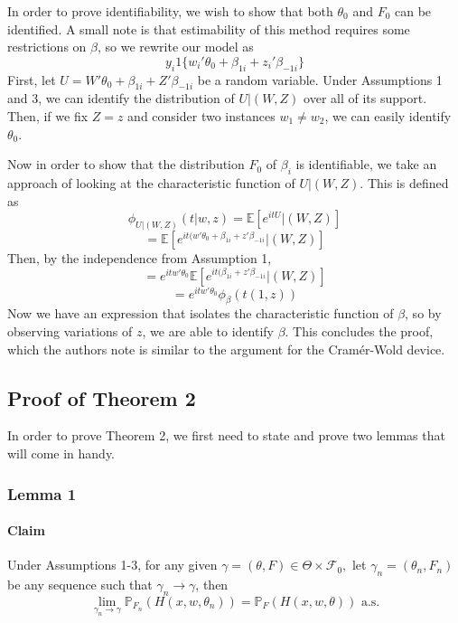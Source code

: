 \documentclass[11pt]{article}
\begin{document}
\indent

In order to prove identifiability, we wish to show that both $\theta_0$ and $F_0$ can be identified. A small note is that estimability of this method requires some restrictions on $\beta$, so we rewrite our model as
\[
y_i1\{w_i'\theta_0 + \beta_{1i} + z_i'\beta_{-1i}\}
\]
First, let $U=W'\theta_0 + \beta_{1i} + Z'\beta_{-1i}$ be a random variable. Under Assumptions 1 and 3, we can identify the distribution of $U|(W,Z)$  over all of its support. Then, if we fix $Z=z$ and consider two instances $w_1\neq w_2$, we can easily identify $\theta_0$.

Now in order to show that the distribution $F_0$ of $\beta_i$ is identifiable, we take an approach of looking at the characteristic function of $U|(W,Z)$. This is defined as
\[
\phi_{U|(W,Z)}(t|w,z)=\mathbb E[e^{itU}|(W,Z)]
\]
\[
=\mathbb E[e^{it(w'\theta_0+\beta_{1i}+z'\beta_{-1i}}|(W,Z)]
\]
Then, by the independence from Assumption 1,
\[
=e^{itw'\theta_0}\mathbb E[e^{it(\beta_{1i}+z'\beta_{-1i}}|(W,Z)]
\]
\[
=e^{itw'\theta_0}\phi_\beta(t(1,z))
\]
Now we have an expression that isolates the characteristic function of $\beta$, so by observing variations of $z$, we are able to identify $\beta$. This concludes the proof, which the authors note is similar to the argument for the Cramér-Wold device.

\subsection{Proof of Theorem 2}

\indent

In order to prove Theorem 2, we first need to state and prove two lemmas that will come in handy.

\subsubsection{Lemma 1}

\paragraph{Claim} Under Assumptions 1-3, for any given $\gamma = (\theta,F)\in\Theta\times\mathcal{F}_0,$ let $\gamma_n=(\theta_n,F_n)$ be any sequence such that $\gamma_n \rightarrow \gamma$, then
\[
\lim_{\gamma_n\rightarrow\gamma}\mathbb{P}_{F_n}(H(x,w,\theta_n))=\mathbb{P}_F(H(x,w,\theta)) \text{  a.s.}
\]
\end{document}
